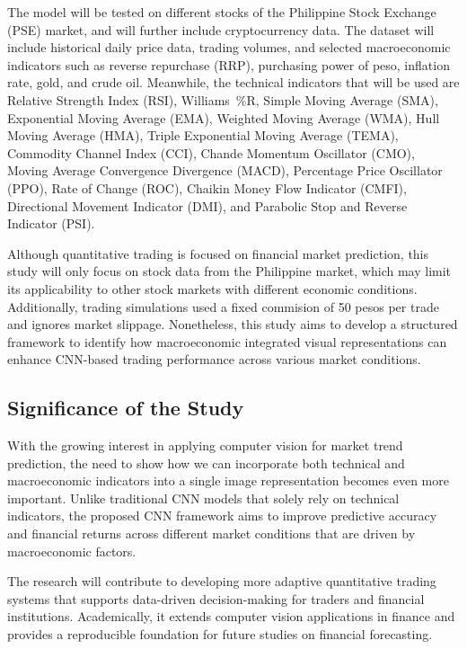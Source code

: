 The model will be tested on different stocks of the Philippine Stock Exchange (PSE) market, and will further include cryptocurrency data. The dataset will include historical daily price data, trading volumes, and selected macroeconomic indicators such as reverse repurchase (RRP), purchasing power of peso, inflation rate, gold, and crude oil. Meanwhile, the technical indicators that will be used are  Relative Strength Index (RSI), Williams~\%R, Simple Moving Average (SMA), Exponential Moving Average (EMA), Weighted Moving Average (WMA), Hull Moving Average (HMA), Triple Exponential Moving Average (TEMA), Commodity Channel Index (CCI), Chande Momentum Oscillator (CMO), Moving Average Convergence Divergence (MACD), Percentage Price Oscillator (PPO), Rate of Change (ROC), Chaikin Money Flow Indicator (CMFI), Directional Movement Indicator (DMI), and Parabolic Stop and Reverse Indicator (PSI).

Although quantitative trading is focused on financial market prediction, this study will only focus on stock data from the Philippine market, which may limit its applicability to other stock markets with different economic conditions. Additionally, trading simulations used a fixed commision of 50 pesos per trade and ignores market slippage. Nonetheless, this study aims to develop a structured framework to identify how macroeconomic integrated visual representations can enhance CNN-based trading performance across various market conditions.

\subsection{Significance of the Study}
With the growing interest in applying computer vision for market trend prediction, the need to show how we can incorporate both technical and macroeconomic indicators into a single image representation becomes even more important. Unlike traditional CNN models that solely rely on technical indicators, the proposed CNN framework aims to improve predictive accuracy and financial returns across different market conditions that are driven by macroeconomic factors.

The research will contribute to developing more adaptive quantitative trading systems that supports data-driven decision-making for traders and financial institutions. Academically, it extends computer vision applications in finance and provides a reproducible foundation for future studies on financial forecasting.




